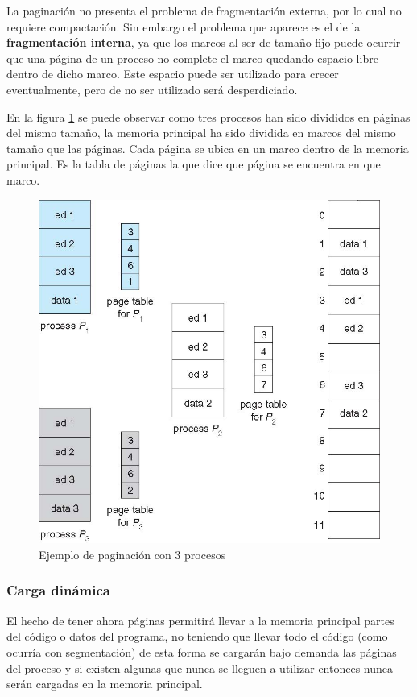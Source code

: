 La paginación no presenta el problema de fragmentación externa, por lo cual no
requiere compactación. Sin embargo el problema que aparece es el de la
\textbf{fragmentación interna}, ya que los marcos al ser de tamaño fijo puede
ocurrir que una página de un proceso no complete el marco quedando espacio libre
dentro de dicho marco. Este espacio puede ser utilizado para crecer
eventualmente, pero de no ser utilizado será desperdiciado.

En la figura \ref{fig:paginacion_varios_procesos} se puede observar como tres
procesos han sido divididos en páginas del mismo tamaño, la memoria principal ha
sido dividida en marcos del mismo tamaño que las páginas. Cada página se ubica
en un marco dentro de la memoria principal. Es la tabla de páginas la que dice
que página se encuentra en que marco.

\begin{figure}[htbp]
\centering
\includegraphics[scale=1]{img/C07_memoria/paginacion_varios_procesos.jpg}
\caption{Ejemplo de paginación con 3 procesos}
\label{fig:paginacion_varios_procesos}
\end{figure}

\subsubsection{Carga dinámica}
El hecho de tener ahora páginas permitirá llevar a la memoria principal partes
del código o datos del programa, no teniendo que llevar todo el código (como
ocurría con segmentación) de esta forma se cargarán bajo demanda las páginas del
proceso y si existen algunas que nunca se lleguen a utilizar entonces nunca
serán cargadas en la memoria principal.

